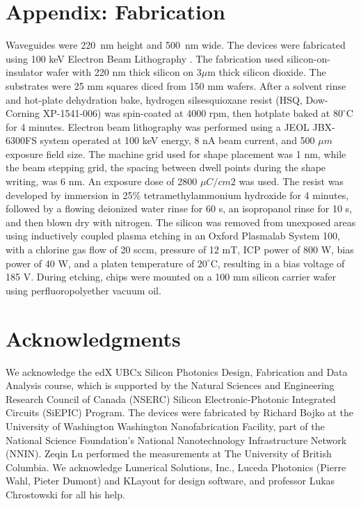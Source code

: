 \documentclass[10pt]{article}
\begin{document}
\section*{Appendix: Fabrication}
\label{sec:appendix}
Waveguides were 220~nm height and 500~nm wide. The devices were fabricated using 100 keV Electron Beam Lithography \cite{Bojko2011}. The fabrication used silicon-on-insulator wafer with 220 nm thick silicon on 3$\mu$m thick silicon dioxide. The substrates were 25 mm squares diced from 150 mm wafers. After a solvent rinse and hot-plate dehydration bake, hydrogen silsesquioxane resist (HSQ, Dow-Corning XP-1541-006) was spin-coated at 4000 rpm, then hotplate baked at $80^\circ$C for 4 minutes. Electron beam lithography was performed using a JEOL JBX-6300FS system operated at 100 keV energy, 8 nA beam current, and 500 $\mu m$ exposure field size. The machine grid used for shape placement was 1 nm, while the beam stepping grid, the spacing between dwell points during the shape writing, was 6 nm. An exposure dose of 2800 $\mu C/cm2$ was used. The resist was developed by immersion in 25\% tetramethylammonium hydroxide for 4 minutes, followed by a flowing deionized water rinse for 60 s, an isopropanol rinse for 10 s, and then blown dry with nitrogen. The silicon was removed from unexposed areas using inductively coupled plasma etching in an Oxford Plasmalab System 100, with a chlorine gas flow of 20 sccm, pressure of 12 mT, ICP power of 800 W, bias power of 40 W, and a platen temperature of $20^\circ$C, resulting in a bias voltage of 185 V. During etching, chips were mounted on a 100 mm silicon carrier wafer using perfluoropolyether vacuum oil. 


\section*{Acknowledgments}
We acknowledge the edX UBCx Silicon Photonics Design, Fabrication and Data Analysis course, which is supported by the Natural Sciences and Engineering Research Council of Canada (NSERC) Silicon Electronic-Photonic Integrated Circuits (SiEPIC) Program.
The devices were fabricated by Richard Bojko at the University of Washington Washington Nanofabrication Facility, part of the National Science Foundation’s National Nanotechnology Infrastructure Network (NNIN).
Zeqin Lu performed the measurements at The University of British Columbia.
We acknowledge Lumerical Solutions, Inc., Luceda Photonics (Pierre Wahl, Pieter Dumont) and KLayout for design software, and professor Lukas Chrostowski for all his help.
\end{document}
